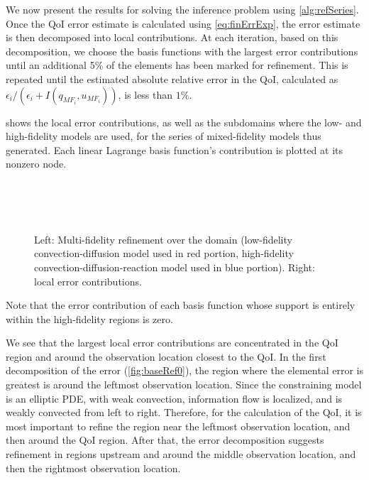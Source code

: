 We now present the results for solving the inference problem using \cref{alg:refSeries}. Once the QoI error estimate is calculated using \cref{eq:finErrExp}, the error estimate is then decomposed into local contributions. At each iteration, based on this decomposition, we choose the basis functions with the largest error contributions until an additional 5\% of the elements has been marked for refinement. This is repeated until the estimated absolute relative error in the QoI, calculated as $\epsilon_i/(\epsilon_i+I(q_{MF_i},u_{MF_i}))$, is less than $1\%$.

 shows the local error contributions, as well as the subdomains where the low- and high-fidelity models are used, for the series of mixed-fidelity models thus generated. Each linear Lagrange basis function's contribution is plotted at its nonzero node.
%
\begin{figure}[htbp]
\centering
{} \\
 \\
 \\
\caption{Left: Multi-fidelity refinement over the domain (low-fidelity convection-diffusion model used in red portion, high-fidelity convection-diffusion-reaction model used in blue portion). Right: local error contributions. }
\label{fig:baseRef}
\end{figure}
%
Note that the error contribution of each basis function whose support is entirely within the high-fidelity regions is zero.

We see that the largest local error contributions are concentrated in the QoI region and around the observation location closest to the QoI. In the first decomposition of the error (\cref{fig:baseRef0}), the region where the elemental error is greatest is around the leftmost observation location. Since the constraining model is an elliptic PDE, with weak convection, information flow is localized, and is weakly convected from left to right. Therefore, for the calculation of the QoI, it is most important to refine the region near the leftmost observation location, and then around the QoI region. After that, the error decomposition suggests refinement in regions upstream and around the middle observation location, and then the rightmost observation location.


